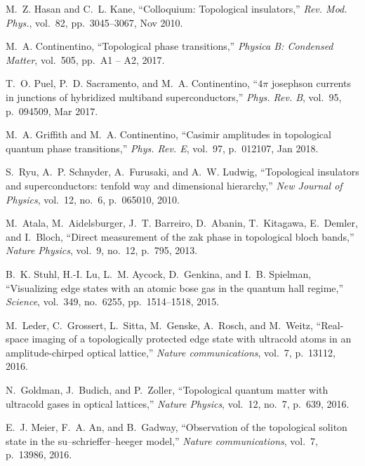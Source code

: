 \documentclass[10pt]{revtex4-1}
\begin{document}
\begin{thebibliography}{10}

M.~Z. Hasan and C.~L. Kane, ``Colloquium: Topological insulators,'' {\em Rev.
  Mod. Phys.}, vol.~82, pp.~3045--3067, Nov 2010.

M.~A. Continentino, ``Topological phase transitions,'' {\em Physica B:
  Condensed Matter}, vol.~505, pp.~A1 -- A2, 2017.

T.~O. Puel, P.~D. Sacramento, and M.~A. Continentino, ``$4\ensuremath{\pi}$
  josephson currents in junctions of hybridized multiband superconductors,''
  {\em Phys. Rev. B}, vol.~95, p.~094509, Mar 2017.

M.~A. Griffith and M.~A. Continentino, ``Casimir amplitudes in topological
  quantum phase transitions,'' {\em Phys. Rev. E}, vol.~97, p.~012107, Jan
  2018.

S.~Ryu, A.~P. Schnyder, A.~Furusaki, and A.~W. Ludwig, ``Topological insulators
  and superconductors: tenfold way and dimensional hierarchy,'' {\em New
  Journal of Physics}, vol.~12, no.~6, p.~065010, 2010.

M.~Atala, M.~Aidelsburger, J.~T. Barreiro, D.~Abanin, T.~Kitagawa, E.~Demler,
  and I.~Bloch, ``Direct measurement of the zak phase in topological bloch
  bands,'' {\em Nature Physics}, vol.~9, no.~12, p.~795, 2013.

B.~K. Stuhl, H.-I. Lu, L.~M. Aycock, D.~Genkina, and I.~B. Spielman,
  ``Visualizing edge states with an atomic bose gas in the quantum hall
  regime,'' {\em Science}, vol.~349, no.~6255, pp.~1514--1518, 2015.

M.~Leder, C.~Grossert, L.~Sitta, M.~Genske, A.~Rosch, and M.~Weitz,
  ``Real-space imaging of a topologically protected edge state with ultracold
  atoms in an amplitude-chirped optical lattice,'' {\em Nature communications},
  vol.~7, p.~13112, 2016.

N.~Goldman, J.~Budich, and P.~Zoller, ``Topological quantum matter with
  ultracold gases in optical lattices,'' {\em Nature Physics}, vol.~12, no.~7,
  p.~639, 2016.

E.~J. Meier, F.~A. An, and B.~Gadway, ``Observation of the topological soliton
  state in the su--schrieffer--heeger model,'' {\em Nature communications},
  vol.~7, p.~13986, 2016.


\end{thebibliography}
\end{document}
